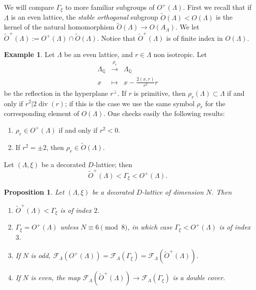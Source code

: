 \documentclass[11pt]{amsart}
\numberwithin{equation}{subsection}
\theoremstyle{plain}
\newtheorem{proposition}[theorem]{Proposition}
\theoremstyle{remark}
\theoremstyle{definition}
\newtheorem{example}[theorem]{Example}
\newcommand{\cF}{{\mathscr F}}
\newcommand{\lra}{\longrightarrow}
\newcommand{\QQ}{{\mathbb Q}}
\newcommand{\wt}{\widetilde}
\DeclareMathOperator{\divisore}{div}
\begin{document}
We will compare $\Gamma_{\xi}$ to more familiar subgroups of $O^+(\Lambda)$. First we recall that if $\Lambda$ is an even lattice, the \emph{stable orthogonal} subgroup  $\wt{O}(\Lambda)< O(\Lambda)$ is the kernel of the natural homomorphism  $\wt{O}(\Lambda)\to O(A_{\Lambda})$. We let $\wt{O}^{+}(\Lambda):=O^+(\Lambda)\cap \wt{O}(\Lambda)$. Notice that $\wt{O}^{+}(\Lambda)$ is of finite index in $O(\Lambda)$. 
%
\begin{example}\label{expl:riflessione}
%
 Let  $\Lambda$ be an even lattice, and $r\in\Lambda$  non isotropic. Let
%
\begin{equation}\label{riflessione}
%
\begin{matrix}
%
\Lambda_{\QQ} & \overset{\rho_r}{\lra} & \Lambda_{\QQ} \\
%
x & \mapsto & x-\frac{2(x,r)}{r^2}r
%
\end{matrix}
%
\end{equation}
%
be the reflection in the hyperplane $r^{\bot}$. If $r$ is primitive, then $\rho_r(\Lambda)\subset\Lambda$ if and only if $r^2| 2\divisore(r)$; if this is the case we use the same symbol $\rho_r$ for the corresponding element of $O(\Lambda)$. One checks easily the following results:
%
\begin{enumerate}
%
\item
%
$\rho_r\in O^{+}(\Lambda)$ if and only if $r^2<0$.
%
\item
%
If $r^2=\pm 2$, then $\rho_r\in \wt{O}(\Lambda)$.
% 
\end{enumerate}
%
%
\end{example}
%
Let  $(\Lambda,\xi)$ be a  decorated $D$-lattice; then
%
\begin{equation}
%
\widetilde O^+(\Lambda)<\Gamma_\xi< O^+(\Lambda).
%
\end{equation}
%
% 
 \begin{proposition}\label{prp:propgroup}
 Let $(\Lambda,\xi)$ be a decorated $D$-lattice of dimension $N$. Then
  \begin{enumerate}
 \item $\widetilde O^+(\Lambda)<\Gamma_\xi$ is of index $2$.
 \item $\Gamma_\xi= O^+(\Lambda)$ unless $N\equiv 6\pmod 8$, in which case $\Gamma_\xi< O^+(\Lambda)$ is of index $3$. 
%
 \item If $N$ is odd, $\cF_\Lambda(O^+(\Lambda))=\cF_{\Lambda}(\Gamma_\xi)= \cF_\Lambda(\widetilde O^+(\Lambda))$.
%
 \item If $N$ is even, the map $\cF_\Lambda(\widetilde O^+(\Lambda))\to \cF_{\Lambda}(\Gamma_\xi)$
 is a double cover. 
  \end{enumerate}
%
 \end{proposition}
\end{document}
